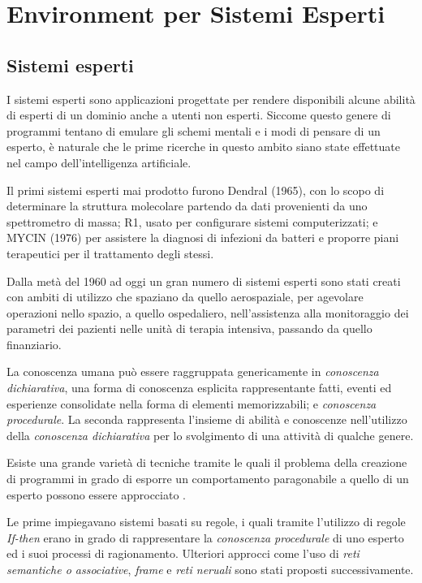 \chapter{Environment per Sistemi Esperti}

\section{Sistemi esperti}
I sistemi esperti sono applicazioni progettate per rendere disponibili alcune abilità di esperti di un dominio anche a utenti non esperti. Siccome questo genere di programmi tentano di emulare gli schemi mentali e i modi di pensare di un esperto, è naturale che le prime ricerche in questo ambito siano state effettuate nel campo dell'intelligenza artificiale.

Il primi sistemi esperti mai prodotto furono Dendral (1965), con lo scopo di determinare la struttura molecolare partendo da dati provenienti da uno spettrometro di massa; R1, usato per configurare sistemi computerizzati; e MYCIN (1976) per assistere la diagnosi di infezioni da batteri e proporre piani terapeutici per il trattamento degli stessi.

Dalla metà del 1960 ad oggi un gran numero di sistemi esperti sono stati creati con ambiti di utilizzo che spaziano da quello aerospaziale, per agevolare operazioni nello spazio, a quello ospedaliero, nell'assistenza alla monitoraggio dei parametri dei pazienti nelle unità di terapia intensiva, passando da quello finanziario.

La conoscenza umana può essere raggruppata genericamente in \emph{conoscenza dichiarativa}, una forma di conoscenza esplicita rappresentante fatti, eventi ed esperienze consolidate nella forma di elementi memorizzabili; e \emph{conoscenza procedurale}. La seconda rappresenta l'insieme di abilità e conoscenze nell'utilizzo della \emph{conoscenza dichiarativa} per lo svolgimento di una attività di qualche genere.

Esiste una grande varietà di tecniche tramite le quali il problema della creazione di programmi in grado di esporre un comportamento paragonabile a quello di un esperto possono essere approcciato \cite{jackson1999}.

Le prime impiegavano sistemi basati su regole, i quali tramite l'utilizzo di regole \emph{If-then} erano in grado di rappresentare la \emph{conoscenza procedurale} di uno esperto ed i suoi processi di ragionamento. Ulteriori approcci come l'uso di \emph{reti semantiche o associative}, \emph{frame} e \emph{reti neruali} sono stati proposti successivamente.

